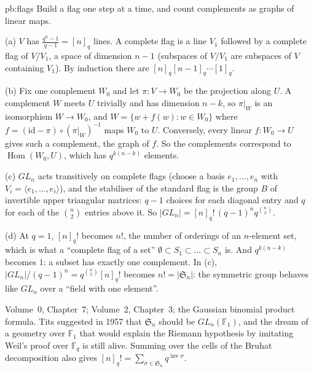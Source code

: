 \begin{solution}{pb:flags}
\idea Build a flag one step at a time, and count complements as graphs of linear maps.

\writeup (a) $V$ has $\frac{q^n-1}{q-1}=[n]_q$ lines. A complete flag is a line $V_1$ followed by a complete flag of $V/V_1$, a space
of dimension $n-1$ (subspaces of $V/V_1$ are subspaces of $V$ containing $V_1$). By induction there are $[n]_q[n-1]_q\cdots[1]_q$.

(b) Fix one complement $W_0$ and let $\pi:V\to W_0$ be the projection along $U$. A complement $W$ meets $U$ trivially and has
dimension $n-k$, so $\pi|_W$ is an isomorphism $W\to W_0$, and $W=\{w+f(w):w\in W_0\}$ where $f=(\mathrm{id}-\pi)\circ(\pi|_W)^{-1}$ maps
$W_0$ to $U$. Conversely, every linear $f:W_0\to U$ gives such a complement, the graph of $f$. So the complements correspond to
$\operatorname{Hom}(W_0,U)$, which has $q^{k(n-k)}$ elements.

(c) $GL_n$ acts transitively on complete flags (choose a basis $e_1,\dots,e_n$ with $V_i=\langle e_1,\dots,e_i\rangle$), and the
stabiliser of the standard flag is the group $B$ of invertible upper triangular matrices: $q-1$ choices for each diagonal entry
and $q$ for each of the $\binom n2$ entries above it. So $|GL_n|=[n]_q!\,(q-1)^nq^{\binom n2}$.

(d) At $q=1$, $[n]_q!$ becomes $n!$, the number of orderings of an $n$-element set, which is what a ``complete flag of a set''
$\emptyset\subset S_1\subset\dots\subset S_n$ is. And $q^{k(n-k)}$ becomes $1$: a subset has exactly one complement. In (c),
$|GL_n|/(q-1)^n=q^{\binom n2}[n]_q!$ becomes $n!=|\mathfrak S_n|$: the symmetric group behaves like $GL_n$ over a ``field with
one element''.

\tools Volume~0, Chapter~7; Volume~2, Chapter~3; the Gaussian binomial product formula.
\leads Tits suggested in 1957 that $\mathfrak S_n$ should be $GL_n(\mathbb F_1)$, and the dream of a geometry over $\mathbb F_1$ that
would explain the Riemann hypothesis by imitating Weil's proof over $\mathbb F_q$ is still alive. Summing over the cells of the
Bruhat decomposition also gives $[n]_q!=\sum_{\sigma\in\mathfrak S_n}q^{\operatorname{inv}\sigma}$.
\end{solution}

